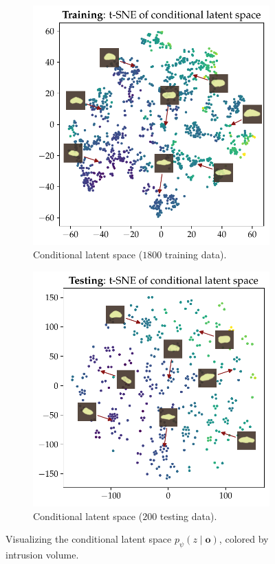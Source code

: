 \begin{figure}[b!]
    \centering
    \begin{subfigure}[t]{0.4715\linewidth}
        \centering
        \includegraphics[width=0.925\linewidth]{figures/ivae/muon/tsne_muon_training.pdf}
        \caption{Conditional latent space ($1800$ training data).}
        \label{fig:tsne_muon_training}
    \end{subfigure}
    \hfill
    \begin{subfigure}[t]{0.48\linewidth}
        \centering
        \includegraphics[width=0.925\linewidth]{figures/ivae/muon/tsne_muon_testing.pdf}
        \caption{Conditional latent space ($200$ testing data).}
        \label{fig:tsne_muon_testing}
    \end{subfigure}
    \caption{Visualizing the conditional latent space $p_\psi(z \mid \mathbf{o})$, colored by intrusion volume.}
    \label{fig:tsne}
\end{figure}


